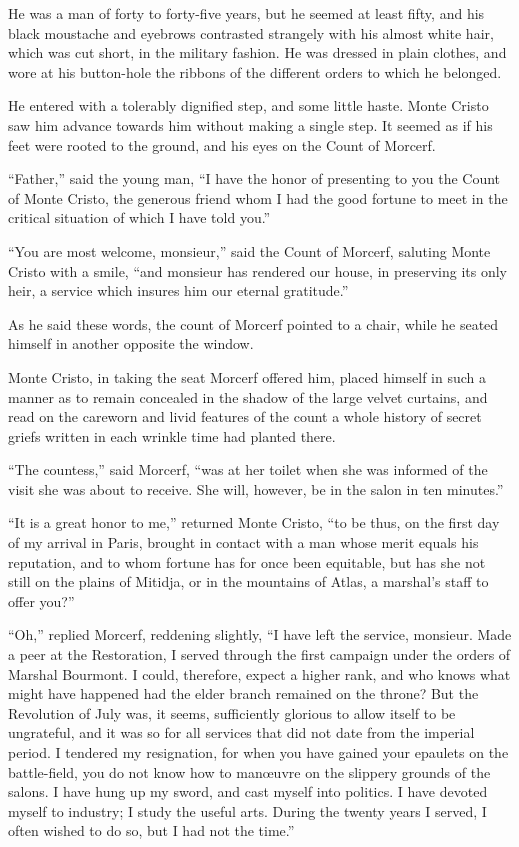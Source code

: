 He was a man of forty to forty-five years, but he seemed at least
fifty, and his black moustache and eyebrows contrasted strangely with
his almost white hair, which was cut short, in the military fashion. He
was dressed in plain clothes, and wore at his button-hole the ribbons
of the different orders to which he belonged.

He entered with a tolerably dignified step, and some little haste.
Monte Cristo saw him advance towards him without making a single step.
It seemed as if his feet were rooted to the ground, and his eyes on the
Count of Morcerf.

“Father,” said the young man, “I have the honor of presenting to you
the Count of Monte Cristo, the generous friend whom I had the good
fortune to meet in the critical situation of which I have told you.”

“You are most welcome, monsieur,” said the Count of Morcerf, saluting
Monte Cristo with a smile, “and monsieur has rendered our house, in
preserving its only heir, a service which insures him our eternal
gratitude.”

As he said these words, the count of Morcerf pointed to a chair, while
he seated himself in another opposite the window.

Monte Cristo, in taking the seat Morcerf offered him, placed himself in
such a manner as to remain concealed in the shadow of the large velvet
curtains, and read on the careworn and livid features of the count a
whole history of secret griefs written in each wrinkle time had planted
there.

“The countess,” said Morcerf, “was at her toilet when she was informed
of the visit she was about to receive. She will, however, be in the
salon in ten minutes.”

“It is a great honor to me,” returned Monte Cristo, “to be thus, on the
first day of my arrival in Paris, brought in contact with a man whose
merit equals his reputation, and to whom fortune has for once been
equitable, but has she not still on the plains of Mitidja, or in the
mountains of Atlas, a marshal’s staff to offer you?”

“Oh,” replied Morcerf, reddening slightly, “I have left the service,
monsieur. Made a peer at the Restoration, I served through the first
campaign under the orders of Marshal Bourmont. I could, therefore,
expect a higher rank, and who knows what might have happened had the
elder branch remained on the throne? But the Revolution of July was, it
seems, sufficiently glorious to allow itself to be ungrateful, and it
was so for all services that did not date from the imperial period. I
tendered my resignation, for when you have gained your epaulets on the
battle-field, you do not know how to manœuvre on the slippery grounds
of the salons. I have hung up my sword, and cast myself into politics.
I have devoted myself to industry; I study the useful arts. During the
twenty years I served, I often wished to do so, but I had not the
time.”

